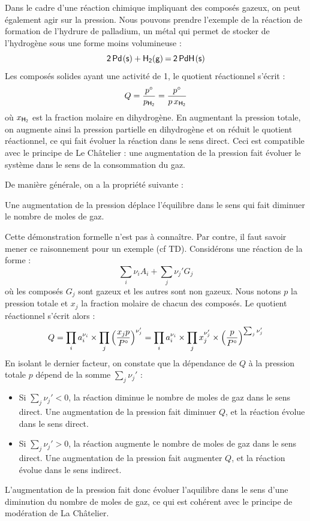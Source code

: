 \documentclass[11pt,fleqn]{book} %
\begin{document}
Dans le cadre d'une réaction chimique impliquant des composés gazeux, on peut également agir sur la pression. Nous pouvons prendre l'exemple de la réaction de formation de l'hydrure de palladium, un métal qui permet de stocker de l'hydrogène sous une forme moins volumineuse :
\begin{equation}
    \ce{2 Pd(s) + H2(g) = 2 PdH(s)}
\end{equation}
Les composés solides ayant une activité de 1, le quotient réactionnel s'écrit :
\begin{equation}
    Q = \frac{p\degree}{p_{\ce{H2}}} = \frac{p\degree}{p\, x_{\ce{H2}}}
\end{equation}
où $x_{\ce{H2}}$ est la fraction molaire en dihydrogène. En augmentant la pression totale, on augmente ainsi la pression partielle en dihydrogène et on réduit le quotient réactionnel, ce qui fait évoluer la réaction dans le sens direct. Ceci est compatible avec le principe de Le Châtelier : une augmentation de la pression fait évoluer le système dans le sens de la consommation du gaz.

De manière générale, on a la propriété suivante :
\begin{proposition}
    Une augmentation de la pression déplace l'équilibre dans le sens qui fait diminuer le nombre de moles de gaz.
\end{proposition}
\begin{demonstration}
    Cette démonstration formelle n'est pas à connaître. Par contre, il faut savoir mener ce raisonnement pour un exemple (cf TD). Considérons une réaction de la forme :
    \begin{equation}
        \sum_i \nu_i A_i + \sum_j \nu_j' G_j
    \end{equation}
    où les composés $G_j$ sont gazeux et les autres sont non gazeux. Nous notons $p$ la pression totale et $x_j$ la fraction molaire de chacun des composés. Le quotient réactionnel s'écrit alors :
    \begin{equation}
        Q = \prod_i a_i^{\nu_i} \times \prod_j \left( \frac{x_j p}{P\degree}\right)^{\nu_j'} = \prod_i a_i^{\nu_i} \times \prod_j x_j^{\nu_j'} \times \left( \frac{p}{P\degree} \right)^{\sum_j \nu_j'}
    \end{equation}
    En isolant le dernier facteur, on constate que la dépendance de $Q$ à la pression totale $p$ dépend de la somme $\sum_j \nu_j'$ :
    \begin{itemize}
        \item Si $\sum_j \nu_j'<0$, la réaction diminue le nombre de moles de gaz dans le sens direct. Une augmentation de la pression fait diminuer $Q$, et la réaction évolue dans le sens direct.
        \item Si $\sum_j \nu_j'>0$, la réaction augmente le nombre de moles de gaz dans le sens direct. Une augmentation de la pression fait augmenter $Q$, et la réaction évolue dans le sens indirect.
    \end{itemize}
    L'augmentation de la pression fait donc évoluer l'aquilibre dans le sens d'une diminution du nombre de moles de gaz, ce qui est cohérent avec le principe de modération de La Châtelier.
\end{demonstration}
\end{document}
